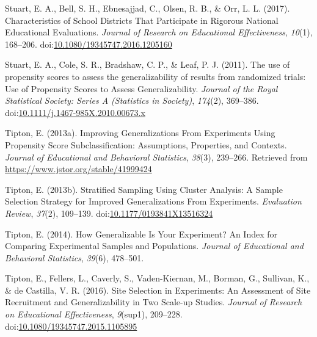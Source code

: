 \documentclass[,man]{apa6}
\theoremstyle{definition}
\theoremstyle{definition}
\theoremstyle{definition}
\theoremstyle{remark}
\begin{document}
\leavevmode\hypertarget{ref-stuartCharacteristicsSchoolDistricts2017}{}%
Stuart, E. A., Bell, S. H., Ebnesajjad, C., Olsen, R. B., \& Orr, L. L.
(2017). Characteristics of School Districts That Participate in Rigorous
National Educational Evaluations. \emph{Journal of Research on
Educational Effectiveness}, \emph{10}(1), 168--206.
doi:\href{https://doi.org/10.1080/19345747.2016.1205160}{10.1080/19345747.2016.1205160}

\leavevmode\hypertarget{ref-stuartUsePropensityScores2011}{}%
Stuart, E. A., Cole, S. R., Bradshaw, C. P., \& Leaf, P. J. (2011). The
use of propensity scores to assess the generalizability of results from
randomized trials: Use of Propensity Scores to Assess Generalizability.
\emph{Journal of the Royal Statistical Society: Series A (Statistics in
Society)}, \emph{174}(2), 369--386.
doi:\href{https://doi.org/10.1111/j.1467-985X.2010.00673.x}{10.1111/j.1467-985X.2010.00673.x}

\leavevmode\hypertarget{ref-tiptonImprovingGeneralizationsExperiments2013}{}%
Tipton, E. (2013a). Improving Generalizations From Experiments Using
Propensity Score Subclassification: Assumptions, Properties, and
Contexts. \emph{Journal of Educational and Behavioral Statistics},
\emph{38}(3), 239--266. Retrieved from
\url{https://www.jstor.org/stable/41999424}

\leavevmode\hypertarget{ref-tiptonStratifiedSamplingUsing2013}{}%
Tipton, E. (2013b). Stratified Sampling Using Cluster Analysis: A Sample
Selection Strategy for Improved Generalizations From Experiments.
\emph{Evaluation Review}, \emph{37}(2), 109--139.
doi:\href{https://doi.org/10.1177/0193841X13516324}{10.1177/0193841X13516324}

\leavevmode\hypertarget{ref-tiptonHowGeneralizableYour2014}{}%
Tipton, E. (2014). How Generalizable Is Your Experiment? An Index for
Comparing Experimental Samples and Populations. \emph{Journal of
Educational and Behavioral Statistics}, \emph{39}(6), 478--501.

\leavevmode\hypertarget{ref-tiptonSiteSelectionExperiments2016}{}%
Tipton, E., Fellers, L., Caverly, S., Vaden-Kiernan, M., Borman, G.,
Sullivan, K., \& de Castilla, V. R. (2016). Site Selection in
Experiments: An Assessment of Site Recruitment and Generalizability in
Two Scale-up Studies. \emph{Journal of Research on Educational
Effectiveness}, \emph{9}(sup1), 209--228.
doi:\href{https://doi.org/10.1080/19345747.2015.1105895}{10.1080/19345747.2015.1105895}

\endgroup
\end{document}

